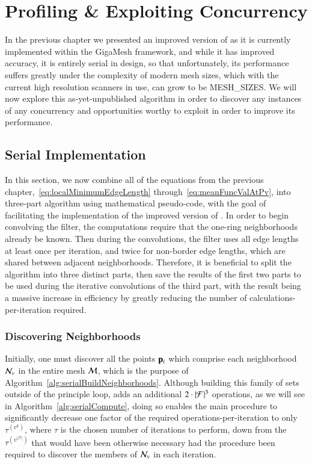\chapter{Profiling \& Exploiting Concurrency}
\label{ch5}
In the previous chapter we presented an improved version of  as it is currently implemented within the GigaMesh framework, and while it has improved accuracy, it is entirely serial in design, so that unfortunately, its performance suffers greatly under the complexity of modern mesh sizes, which with the current high resolution scanners in use, can grow to be MESH\_SIZES. We will now explore this as-yet-unpublished algorithm in order to discover any instances of any concurrency and opportunities worthy to exploit in order to improve its performance.

%
%
%
%
\section{Serial Implementation}
\label{ch5sSI}
In this section, we now combine all of the equations from the previous chapter,~\ref{eq:localMinimumEdgeLength} through~\ref{eq:meanFuncValAtPv}, into three-part algorithm using mathematical pseudo-code, with the goal of facilitating the implementation of the improved version of . In order to begin convolving the filter, the computations require that the one-ring neighborhoods already be known. Then during the convolutions, the filter uses all edge lengths at least once per iteration, and twice for non-border edge lengths, which are shared between adjacent neighborhoods. Therefore, it is beneficial to split the algorithm into three distinct parts, then save the results of the first two parts to be used during the iterative convolutions of the third part, with the result being a massive increase in efficiency by greatly reducing the number of calculations-per-iteration required.

%
%
%
\subsection{Discovering Neighborhoods}
\label{ch5sSIssDN}
Initially, one must discover all the points $\mathbf{p}_i$ which comprise each neighborhood $\mathcal{N}_v$ in the entire mesh $\mathcal{M}$, which is the purpose of Algorithm~\ref{alg:serialBuildNeighborhoods}. Although building this family of sets outside of the principle loop, adds an additional $2\cdot |\mathcal{F}|^3$ operations, as we will see in Algorithm~\ref{alg:serialCompute}, doing so enables the main procedure to significantly decrease one factor of the required operations-per-iteration to only $\tau^{(v^k)}$, where $\tau$ is the chosen number of iterations to perform, down from the $\tau^{(v^{|\mathcal{F}|})}$ that would have been otherwise necessary had the procedure been required to discover the members of $\mathcal{N}_v$ in each iteration.%
%

